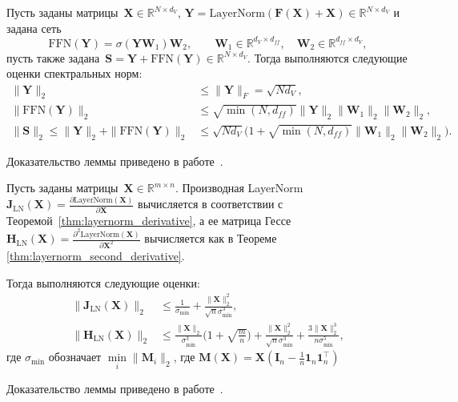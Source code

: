 \begin{lemma}\label{lemma:Y_S_norm_bounds}
Пусть заданы матрицы~$\mathbf{X}\in\mathbb{R}^{N\times d_V}$, $\mathbf{Y}=\mathrm{LayerNorm}(\mathbf{F}(\mathbf{X})+\mathbf{X})\in\mathbb{R}^{N\times d_V}$ и задана сеть
\[
    \mathrm{FFN}(\mathbf{Y})=\sigma(\mathbf{Y}\mathbf{W}_1)\mathbf{W}_2,\qquad\mathbf{W}_1\in\mathbb{R}^{d_V\times d_{ff}},\quad\mathbf{W}_2\in\mathbb{R}^{d_{ff}\times d_V},
\]
пусть также задана~$\mathbf{S}=\mathbf{Y}+\mathrm{FFN}(\mathbf{Y})\in\mathbb{R}^{N\times d_V}$.
Тогда выполняются следующие оценки спектральных норм:
\begin{align}
    \|\mathbf{Y}\|_2 &\le \|\mathbf{Y}\|_F = \sqrt{N d_V}, 
    \label{eq:Y_norm_bound}
    \\
    \|\mathrm{FFN}(\mathbf{Y})\|_2 &\le \sqrt{\min(N,d_{ff})} \|\mathbf{Y}\|_2\|\mathbf{W}_1\|_2\|\mathbf{W}_2\|_2,
    \label{eq:FFN_norm_bound}
    \\
    \|\mathbf{S}\|_2 \le \|\mathbf{Y}\|_2 + \|\mathrm{FFN}(\mathbf{Y})\|_2 
    &\le \sqrt{N d_V}\Big(1+\sqrt{\min(N,d_{ff})}\|\mathbf{W}_1\|_2\|\mathbf{W}_2\|_2\Big).
    \label{eq:S_norm_bound}
\end{align}
\end{lemma}
Доказательство леммы приведено в работе~\cite{petrov2025curvaturegap}.

\begin{lemma}\label{lemma:layernorm_deriv_hessian_norm}
Пусть заданы матрицы~$\mathbf{X} \in \mathbb{R}^{m \times n}$.
Производная LayerNorm $\mathbf{J}_{\mathrm{LN}}(\mathbf{X}) = \frac{\partial \text{LayerNorm}(\mathbf{X})}{\partial \mathbf{X}}$ вычисляется в соответствии с Теоремой~\ref{thm:layernorm_derivative}, а ее матрица Гессе $\mathbf{H}_{\mathrm{LN}}(\mathbf{X}) = \frac{\partial^2 \text{LayerNorm}(\mathbf{X})}{\partial \mathbf{X}^2}$ вычисляется как в Теореме \ref{thm:layernorm_second_derivative}.

Тогда выполняются следующие оценки:
\begin{align}
    \big\|\mathbf{J}_{\mathrm{LN}}(\mathbf{X})\big\|_2
    &\le \frac{1}{\sigma_{\min}} + \frac{\|\mathbf{X}\|_2^2}{\sqrt{n}\sigma_{\min}^3}, \label{eq:ln_jac_norm_bound}\\[4pt]
    \big\|\mathbf{H}_{\mathrm{LN}}(\mathbf{X})\big\|_2
    &\le \frac{\|\mathbf{X}\|_2}{\sigma_{\min}^3}\Big(1+\sqrt{\tfrac{m}{n}}\Big)
    + \frac{\|\mathbf{X}\|_2^2}{\sqrt{n}\sigma_{\min}^3}
    + \frac{3\|\mathbf{X}\|_2^3}{n\sigma_{\min}^5},
    \label{eq:ln_hess_norm_bound}
\end{align}
где $\sigma_{\min}$ обозначает $\min \limits_i \|\mathbf{M}_i \|_2$, где $\mathbf{M}(\mathbf{X}) = \mathbf{X}(\mathbf{I}_n - \tfrac{1}{n}\mathbf{1}_n\mathbf{1}_n^\top)$
\end{lemma}
Доказательство леммы приведено в работе~\cite{petrov2025curvaturegap}.

